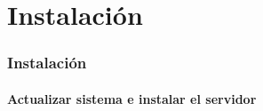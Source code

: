 \section{Instalaci\'on}
  \begin{frame}
    \frametitle{Instalaci\'on}
    \framesubtitle{Actualizar sistema e instalar el servidor}
    \begin{shell}
      \\ 
      \\ \\
    \hline\end{shell}
  \end{frame}
